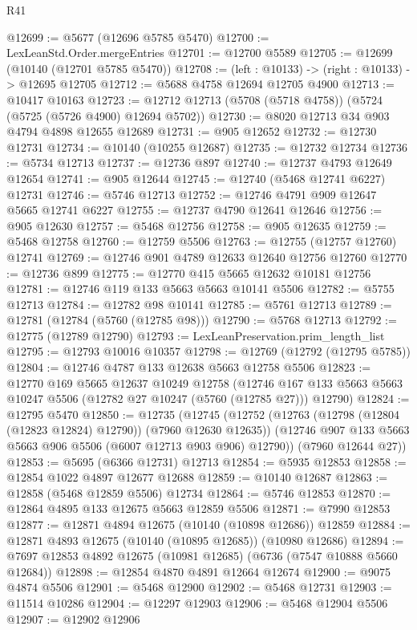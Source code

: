 \begin{lexlean}{R41}
\begin{coremodule}
@12699 := @5677 (@12696 @5785 @5470)
@12700 := LexLeanStd.Order.mergeEntries
@12701 := @12700 @5589
@12705 := @12699 (@10140 (@12701 @5785 @5470))
@12708 := (left : @10133) -> (right : @10133) -> @12695 @12705
@12712 := @5688 @4758 @12694 @12705 @4900
@12713 := @10417 @10163
@12723 := @12712 @12713 (@5708 (@5718 @4758)) (@5724 (@5725 (@5726 @4900) @12694 @5702))
@12730 := @8020 @12713 @34 @903 @4794 @4898 @12655 @12689
@12731 := @905 @12652
@12732 := @12730 @12731
@12734 := @10140 (@10255 @12687)
@12735 := @12732 @12734
@12736 := @5734 @12713
@12737 := @12736 @897
@12740 := @12737 @4793 @12649 @12654
@12741 := @905 @12644
@12745 := @12740 (@5468 @12741 @6227) @12731
@12746 := @5746 @12713
@12752 := @12746 @4791 @909 @12647 @5665 @12741 @6227
@12755 := @12737 @4790 @12641 @12646
@12756 := @905 @12630
@12757 := @5468 @12756
@12758 := @905 @12635
@12759 := @5468 @12758
@12760 := @12759 @5506
@12763 := @12755 (@12757 @12760) @12741
@12769 := @12746 @901 @4789 @12633 @12640 @12756 @12760
@12770 := @12736 @899
@12775 := @12770 @415 @5665 @12632 @10181 @12756
@12781 := @12746 @119 @133 @5663 @5663 @10141 @5506
@12782 := @5755 @12713
@12784 := @12782 @98 @10141
@12785 := @5761 @12713
@12789 := @12781 (@12784 (@5760 (@12785 @98)))
@12790 := @5768 @12713
@12792 := @12775 (@12789 @12790)
@12793 := LexLeanPreservation.prim_length_list
@12795 := @12793 @10016 @10357
@12798 := @12769 (@12792 (@12795 @5785))
@12804 := @12746 @4787 @133 @12638 @5663 @12758 @5506
@12823 := @12770
    @169
    @5665
    @12637
    @10249
    @12758
    (@12746 @167 @133 @5663 @5663 @10247 @5506 (@12782 @27 @10247 (@5760 (@12785 @27))) @12790)
@12824 := @12795 @5470
@12850 := @12735
    (@12745
      (@12752
        (@12763 (@12798 (@12804 (@12823 @12824) @12790)) (@7960 @12630 @12635))
        (@12746 @907 @133 @5663 @5663 @906 @5506 (@6007 @12713 @903 @906) @12790))
      (@7960 @12644 @27))
@12853 := @5695 (@6366 @12731) @12713
@12854 := @5935 @12853
@12858 := @12854 @1022 @4897 @12677 @12688
@12859 := @10140 @12687
@12863 := @12858 (@5468 @12859 @5506) @12734
@12864 := @5746 @12853
@12870 := @12864 @4895 @133 @12675 @5663 @12859 @5506
@12871 := @7990 @12853
@12877 := @12871 @4894 @12675 (@10140 (@10898 @12686)) @12859
@12884 := @12871 @4893 @12675 (@10140 (@10895 @12685)) (@10980 @12686)
@12894 := @7697 @12853 @4892 @12675 (@10981 @12685) (@6736 (@7547 @10888 @5660 @12684))
@12898 := @12854 @4870 @4891 @12664 @12674
@12900 := @9075 @4874 @5506
@12901 := @5468 @12900
@12902 := @5468 @12731
@12903 := @11514 @10286
@12904 := @12297 @12903
@12906 := @5468 @12904 @5506
@12907 := @12902 @12906

\end{coremodule}
\end{lexlean}
